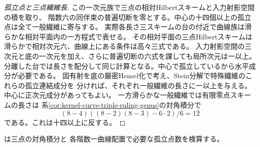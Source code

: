 \begin{proof}[孤立点と三点繊維長]
この一次元族で三点の相対Hilbertスキームと入力射影空間の積を取り、
階数六の同伴束の普遍切断を零とする。中心の十四個以上の孤立点は全て一般繊維に寄与する。
実際各長さ三スキームの台の付近で曲線族は滑らかな相対平面内の一方程式で表せる。
その相対平面の三点Hilbertスキームは滑らかで相対次元六、曲線上にある条件は高々三式である。
入力射影空間の三次元と底の一次元を加え、さらに普遍切断の六式を課しても局所次元は一以上。
分離した台では長さを配分して同じ計算となる。中心で孤立しているから水平成分が必要である。
固有射を底の厳密Hensel化で考え、Stein分解で特殊繊維のこれらの孤立連結成分を
分ければ、それぞれ一般繊維の長さに一以上を与える。中心に正次元成分があってもよい。
一方滑らかな一般繊維では有限零点スキームの長さは
系\ref{cor:kernel-curve-triple-ruling-genus}の対角積分で
\[
         (8-4)((8-2)(8-3)-6\cdot2)/6=12
\]
である。これは十四以上に反する。
\end{proof}
 は三点の対角積分と
各階数一曲線配置で必要な孤立点数を検算する。
